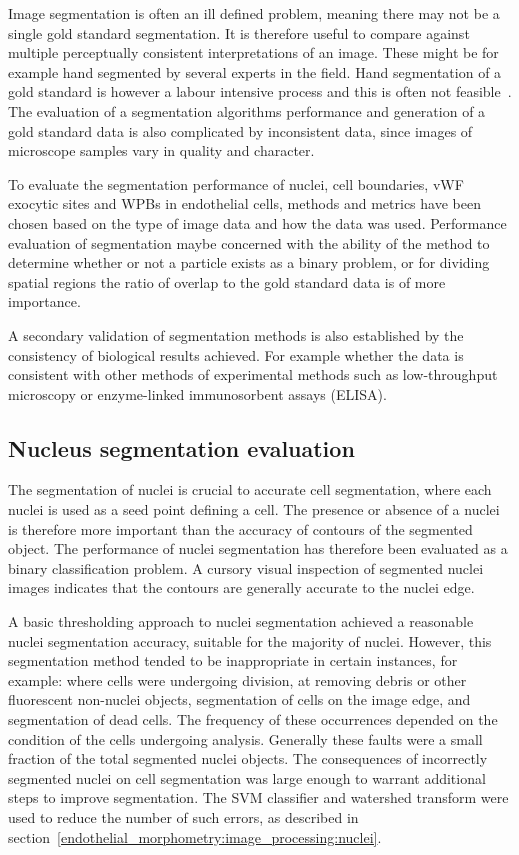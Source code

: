 Image segmentation is often an ill defined problem, meaning there may not be a single gold standard segmentation. It is therefore useful to compare against multiple perceptually consistent interpretations of an image. These might be for example hand segmented by several experts in the field. Hand segmentation of a gold standard is however a labour intensive process and this is often not feasible~\cite{Unnikrishnan2005}. The evaluation of a segmentation algorithms performance and generation of a gold standard data is also complicated by inconsistent data, since images of microscope samples vary in quality and character.

To evaluate the segmentation performance of nuclei, cell boundaries, vWF exocytic sites and WPBs in endothelial cells, methods and metrics have been chosen based on the type of image data and how the data was used. Performance evaluation of segmentation maybe concerned with the ability of the method to determine whether or not a particle exists as a binary problem, or for dividing spatial regions the ratio of overlap to the gold standard data is of more importance.

A secondary validation of segmentation methods is also established by the consistency of biological results achieved. For example whether the data is consistent with other methods of experimental methods such as low-throughput microscopy or enzyme-linked immunosorbent assays (ELISA).

\subsection{Nucleus segmentation evaluation}
\label{endothelial_morphometry:performance_evaluation:nucleus}
The segmentation of nuclei is crucial to accurate cell segmentation, where each nuclei is used as a seed point defining a cell. The presence or absence of a nuclei is therefore more important than the accuracy of contours of the segmented object. The performance of nuclei segmentation has therefore been evaluated as a binary classification problem. A cursory visual inspection of segmented nuclei images indicates that the contours are generally accurate to the nuclei edge.

A basic thresholding approach to nuclei segmentation achieved a reasonable nuclei segmentation accuracy, suitable for the majority of nuclei. However, this segmentation method tended to be inappropriate in certain instances, for example: where cells were undergoing division, at removing debris or other fluorescent non-nuclei objects, segmentation of cells on the image edge, and segmentation of dead cells. The frequency of these occurrences depended on the condition of the cells undergoing analysis. Generally these faults were a small fraction of the total segmented nuclei objects. The consequences of incorrectly segmented nuclei on cell segmentation was large enough to warrant additional steps to improve segmentation. The SVM classifier and watershed transform were used to reduce the number of such errors, as described in section~\ref{endothelial_morphometry:image_processing:nuclei}.

